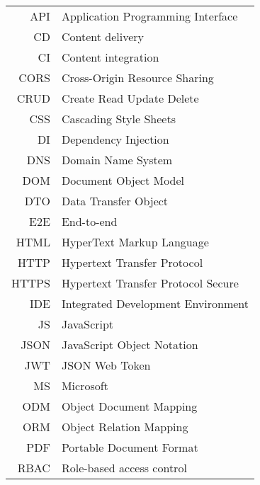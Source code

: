 \begin{longtable}{rl}
API & Application Programming Interface\\
CD & Content delivery\\
CI & Content integration\\
CORS & Cross-Origin Resource Sharing\\
CRUD & Create Read Update Delete\\
CSS & Cascading Style Sheets\\
DI & Dependency Injection\\
DNS & Domain Name System\\
DOM & Document Object Model\\
DTO & Data Transfer Object\\
E2E & End-to-end\\
HTML & HyperText Markup Language\\
HTTP & Hypertext Transfer Protocol\\
HTTPS & Hypertext Transfer Protocol Secure\\
IDE & Integrated Development Environment\\
JS & JavaScript\\
JSON & JavaScript Object Notation\\
JWT & JSON Web Token\\
MS & Microsoft\\
ODM & Object Document Mapping\\
ORM & Object Relation Mapping\\
PDF & Portable Document Format\\
RBAC & Role-based access control\\

\end{longtable}
